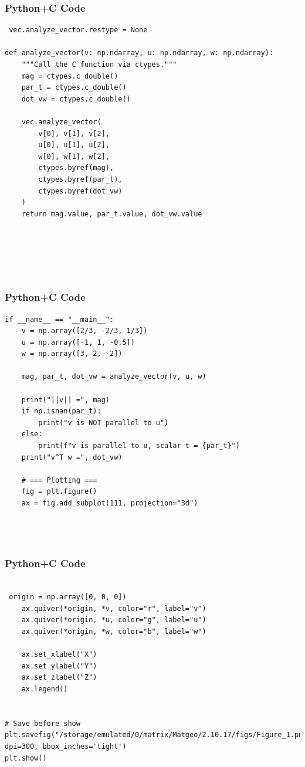 \documentclass{beamer}
\begin{document}
\begin{frame}[fragile]
    \frametitle{Python+C Code}
    \begin{lstlisting}
 vec.analyze_vector.restype = None

def analyze_vector(v: np.ndarray, u: np.ndarray, w: np.ndarray):
    """Call the C function via ctypes."""
    mag = ctypes.c_double()
    par_t = ctypes.c_double()
    dot_vw = ctypes.c_double()

    vec.analyze_vector(
        v[0], v[1], v[2],
        u[0], u[1], u[2],
        w[0], w[1], w[2],
        ctypes.byref(mag),
        ctypes.byref(par_t),
        ctypes.byref(dot_vw)
    )
    return mag.value, par_t.value, dot_vw.value






    \end{lstlisting}
\end{frame}

\begin{frame}[fragile]
    \frametitle{Python+C Code}
    \begin{lstlisting}
if __name__ == "__main__":
    v = np.array([2/3, -2/3, 1/3])
    u = np.array([-1, 1, -0.5])
    w = np.array([3, 2, -2])

    mag, par_t, dot_vw = analyze_vector(v, u, w)

    print("||v|| =", mag)
    if np.isnan(par_t):
        print("v is NOT parallel to u")
    else:
        print(f"v is parallel to u, scalar t = {par_t}")
    print("v^T w =", dot_vw)

    # === Plotting ===
    fig = plt.figure()
    ax = fig.add_subplot(111, projection="3d")

   


    \end{lstlisting}
\end{frame}


\begin{frame}[fragile]
    \frametitle{Python+C Code}
    \begin{lstlisting}

 origin = np.array([0, 0, 0])
    ax.quiver(*origin, *v, color="r", label="v")
    ax.quiver(*origin, *u, color="g", label="u")
    ax.quiver(*origin, *w, color="b", label="w")

    ax.set_xlabel("X")
    ax.set_ylabel("Y")
    ax.set_zlabel("Z")
    ax.legend()


# Save before show
plt.savefig("/storage/emulated/0/matrix/Matgeo/2.10.17/figs/Figure_1.png", dpi=300, bbox_inches='tight')
plt.show()
    \end{lstlisting}
\end{frame}
\end{document}
